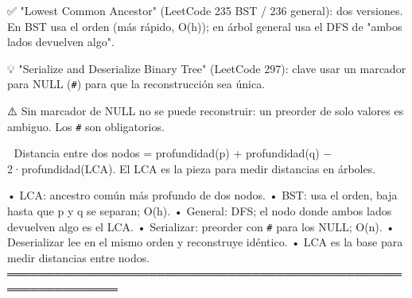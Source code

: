 \begin{dsaentrevistas}

✅ "Lowest Common Ancestor" (LeetCode 235 BST / 236 general): dos
   versiones. En BST usa el orden (más rápido, O(h)); en árbol general
   usa el DFS de "ambos lados devuelven algo".

💡 "Serialize and Deserialize Binary Tree" (LeetCode 297): clave usar un
   marcador para NULL (\verb|#|) para que la reconstrucción sea única.

⚠️ Sin marcador de NULL no se puede reconstruir: un preorder de solo
   valores es ambiguo. Los \verb|#| son obligatorios.

🔑 Distancia entre dos nodos = profundidad(p) + profundidad(q) −
   2·profundidad(LCA). El LCA es la pieza para medir distancias en
   árboles.

\end{dsaentrevistas}

\begin{dsaresumen}

• LCA: ancestro común más profundo de dos nodos.
• BST: usa el orden, baja hasta que p y q se separan; O(h).
• General: DFS; el nodo donde ambos lados devuelven algo es el LCA.
• Serializar: preorder con \verb|#| para los NULL; O(n).
• Deserializar lee en el mismo orden y reconstruye idéntico.
• LCA es la base para medir distancias entre nodos.
════════════════════════════════════════════════════════════════

\end{dsaresumen}
